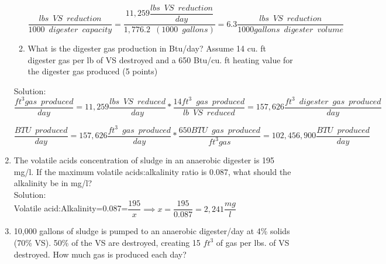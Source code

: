 \begin{enumerate}
\begin{enumerate}
$
	\dfrac
	{
	lbs \enspace VS \enspace reduction
	}
	{
	1000 \enspace digester \enspace capacity
	}
	=
	\dfrac
	{
	11,259 \dfrac
			{
			lbs \enspace VS \enspace reduction
			}
			{
			day
			}
	}
	{	
	1,776.2 \enspace (1000 \enspace gallons)
	}
 	=\boxed{6.3
	\dfrac
	{
	lbs \enspace VS \enspace reduction
	}
	{
	1000 gallons \enspace digester \enspace volume 
	}}
$
\\

\vspace{1cm}

\item  What is the digester gas production in Btu/day? Assume 14 cu. ft digester gas per lb of VS destroyed and a 650 Btu/cu. ft heating value for the digester gas produced (5 points)
\end{enumerate}
\vspace{1cm}
Solution:\\

$
	\dfrac 
	{
	ft^3 gas \enspace produced
	}
	{
	day
	}
	=
	11,259 \dfrac
			{
			lbs \enspace VS \enspace reduced
			}
			{
			day
			}
			*
		\dfrac
		{
		14 ft^3 \enspace gas \enspace produced
		}
		{
		lb \enspace VS \enspace reduced
		}
		=157,626 \dfrac
				{
				ft^3 \enspace digester \enspace 					gas \enspace produced
				}
				{
				day
				}
$
\\
\vspace{1cm}


$
	\dfrac 
	{
	BTU \enspace produced
	}
	{
	day
	}
	=
	157,626 \dfrac
			{
			ft^3 \enspace gas \enspace produced
			}
			{
			day
			}
			*
		\dfrac
		{
		650 BTU \enspace gas \enspace produced
		}
		{
		ft^3 gas
		}
		=\boxed{102,456,900 \dfrac
				{
				BTU \enspace produced
				}
				{
				day
				}}
$



\item The volatile acids concentration of sludge in an anaerobic digester is 195 mg/l. If the maximum volatile acids:alkalinity ratio is 0.087, what should the alkalinity be in mg/l?\\
Solution:\\
Volatile acid:Alkalinity=0.087=$\dfrac{195}{x}\implies x = \dfrac{195}{0.087} =\boxed{2,241\dfrac{mg}{l}}$
\pagebreak
	
\item 10,000 gallons of sludge is pumped to an anaerobic digester/day at 4\% solids (70\% VS).  50\% of the VS are destroyed, creating 15 $ft^3$ of gas per lbs. of VS destroyed. How much gas is produced each day?\\


\end{enumerate}
